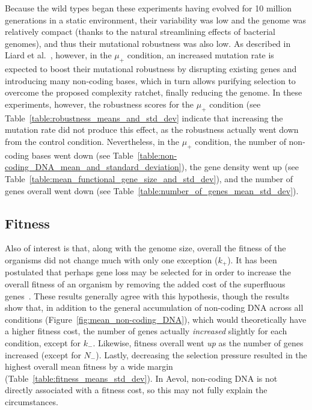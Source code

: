 Because the wild types began these experiments having evolved for 10 million generations in a static environment, their variability was low and the genome was relatively compact (thanks to the natural streamlining effects of bacterial genomes), and thus their mutational robustness was also low. As described in Liard et al.~\cite{Liard.2018}, however, in the $\mu_+$ condition, an increased mutation rate is expected to boost their mutational robustness by disrupting existing genes and introducing many non-coding bases, which in turn allows purifying selection to overcome the proposed complexity ratchet, finally reducing the genome. In these experiments, however, the robustness scores for the $\mu_+$ condition (see Table~\ref{table:robustness_means_and_std_dev} indicate that increasing the mutation rate did not produce this effect, as the robustness actually went down from the control condition. Nevertheless, in the $\mu_+$ condition, the number of non-coding bases went down (see Table~\ref{table:non-coding_DNA_mean_and_standard_deviation}), the gene density went up (see Table~\ref{table:mean_functional_gene_size_and_std_dev}), and the number of genes overall went down (see Table~\ref{table:number_of_genes_mean_std_dev}). %

\subsection{Fitness}
Also of interest is that, along with the genome size, overall the fitness of the organisms did not change much with only one exception ($k_+$). It has been postulated that perhaps gene loss may be selected for in order to increase the overall fitness of an organism by removing the added cost of the superfluous genes~\cite{koskiniemi2012}. These results generally agree with this hypothesis, though the results show that, in addition to the general accumulation of non-coding DNA across all conditions (Figure~\ref{fig:mean_non-coding_DNA}), which would theoretically have a higher fitness cost, the number of genes actually \textit{increased} slightly for each condition, except for $k_-$. Likewise, fitness overall went \textit{up} as the number of genes increased (except for $N_-$). Lastly, decreasing the selection pressure resulted in the highest overall mean fitness by a wide margin (Table~\ref{table:fitness_means_std_dev}). In Aevol, non-coding DNA is not directly associated with a fitness cost, so this may not fully explain the circumstances.  

